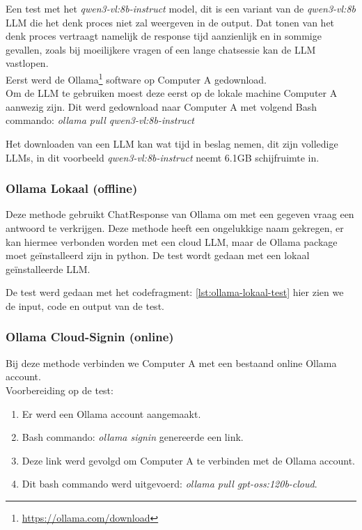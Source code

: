Een test met het \textit{qwen3-vl:8b-instruct} model, dit is een variant van de \textit{qwen3-vl:8b} LLM die het denk proces niet zal weergeven in de output. Dat tonen van het denk proces vertraagt namelijk de response tijd aanzienlijk en in sommige gevallen, zoals bij moeilijkere vragen of een lange chatsessie kan de LLM vastlopen. \\

Eerst werd de Ollama\footnote{\href{https://ollama.com/download}{https://ollama.com/download}} software op Computer A gedownload. \\

Om de LLM te gebruiken moest deze eerst op de lokale machine Computer A aanwezig zijn. Dit werd gedownload naar Computer A met volgend Bash commando:
\textit{ollama pull qwen3-vl:8b-instruct}

Het downloaden van een LLM kan wat tijd in beslag nemen, dit zijn volledige LLMs, in dit voorbeeld \textit{qwen3-vl:8b-instruct} neemt 6.1GB schijfruimte in. \\

\subsubsection{Ollama Lokaal (offline)}
\label{sssec:ollamalokaal}

Deze methode gebruikt ChatResponse van Ollama om met een gegeven vraag een antwoord te verkrijgen. Deze methode heeft een ongelukkige naam gekregen, er kan hiermee verbonden worden met een cloud LLM, maar de Ollama package moet geïnstalleerd zijn in python. De test wordt gedaan met een lokaal geïnstalleerde LLM.

De test werd gedaan met het codefragment: \ref{lst:ollama-lokaal-test} hier zien we de input, code en output van de test.

\subsubsection{Ollama Cloud-Signin (online)}
\label{sssec:ollamacloudsignin}

Bij deze methode verbinden we Computer A met een bestaand online Ollama account. \\

Voorbereiding op de test:
\begin{enumerate}
    \item Er werd een Ollama account aangemaakt.
    \item Bash commando: \textit{ollama signin} genereerde een link.
    \item Deze link werd gevolgd om Computer A te verbinden met de Ollama account.
    \item Dit bash commando werd uitgevoerd: \textit{ollama pull gpt-oss:120b-cloud}.
\end{enumerate}

